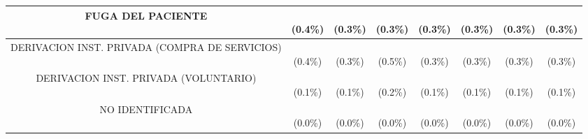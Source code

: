 \begin{table}[htbp]
\begin{tabular}{|c|c|c|c|c|c|c|c|}
\parbox[t]{4.0cm}{\raggedright FUGA DEL PACIENTE} & \parbox[t]{1.2cm}{\\(0.4\%)} & \parbox[t]{1.2cm}{\\(0.3\%)} & \parbox[t]{1.2cm}{\\(0.3\%)} & \parbox[t]{1.2cm}{\\(0.3\%)} & \parbox[t]{1.2cm}{\\(0.3\%)} & \parbox[t]{1.2cm}{\\(0.3\%)} & \parbox[t]{1.6cm}{\\(0.3\%)} \\ \hline
\parbox[t]{4.0cm}{\raggedright DERIVACION INST. PRIVADA (COMPRA DE SERVICIOS)} & \parbox[t]{1.2cm}{\\(0.4\%)} & \parbox[t]{1.2cm}{\\(0.3\%)} & \parbox[t]{1.2cm}{\\(0.5\%)} & \parbox[t]{1.2cm}{\\(0.3\%)} & \parbox[t]{1.2cm}{\\(0.3\%)} & \parbox[t]{1.2cm}{\\(0.3\%)} & \parbox[t]{1.6cm}{\\(0.3\%)} \\ \hline
\parbox[t]{4.0cm}{\raggedright DERIVACION INST. PRIVADA (VOLUNTARIO)} & \parbox[t]{1.2cm}{\\(0.1\%)} & \parbox[t]{1.2cm}{\\(0.1\%)} & \parbox[t]{1.2cm}{\\(0.2\%)} & \parbox[t]{1.2cm}{\\(0.1\%)} & \parbox[t]{1.2cm}{\\(0.1\%)} & \parbox[t]{1.2cm}{\\(0.1\%)} & \parbox[t]{1.6cm}{\\(0.1\%)} \\ \hline
\parbox[t]{4.0cm}{\raggedright NO IDENTIFICADA} & \parbox[t]{1.2cm}{\\(0.0\%)} & \parbox[t]{1.2cm}{\\(0.0\%)} & \parbox[t]{1.2cm}{\\(0.0\%)} & \parbox[t]{1.2cm}{\\(0.0\%)} & \parbox[t]{1.2cm}{\\(0.0\%)} & \parbox[t]{1.2cm}{\\(0.0\%)} & \parbox[t]{1.6cm}{\\(0.0\%)} \\ \hline

\end{tabular}
\end{table}
